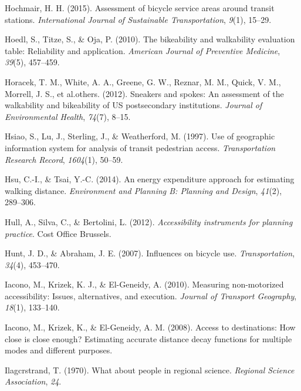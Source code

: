 \documentclass[
11pt, %
oneside, %
english, %
singlespacing, %
]{macthesis} %
\newlength{\cslhangindent}
\newenvironment{CSLReferences}[2] %
 {%
  \setlength{\parindent}{0pt}
  \ifodd #1 \everypar{\setlength{\hangindent}{\cslhangindent}}\ignorespaces\fi
  \ifnum #2 > 0
  \setlength{\parskip}{#2\baselineskip}
  \fi
 }%
 {}
\begin{document}
\begin{CSLReferences}{1}{0}
\leavevmode{}%
Hochmair, H. H. (2015). Assessment of bicycle service areas around transit stations. \emph{International Journal of Sustainable Transportation}, \emph{9}(1), 15--29.

\leavevmode{}%
Hoedl, S., Titze, S., \& Oja, P. (2010). The bikeability and walkability evaluation table: Reliability and application. \emph{American Journal of Preventive Medicine}, \emph{39}(5), 457--459.

\leavevmode{}%
Horacek, T. M., White, A. A., Greene, G. W., Reznar, M. M., Quick, V. M., Morrell, J. S., et al.others. (2012). Sneakers and spokes: An assessment of the walkability and bikeability of US postsecondary institutions. \emph{Journal of Environmental Health}, \emph{74}(7), 8--15.

\leavevmode{}%
Hsiao, S., Lu, J., Sterling, J., \& Weatherford, M. (1997). Use of geographic information system for analysis of transit pedestrian access. \emph{Transportation Research Record}, \emph{1604}(1), 50--59.

\leavevmode{}%
Hsu, C.-I., \& Tsai, Y.-C. (2014). An energy expenditure approach for estimating walking distance. \emph{Environment and Planning B: Planning and Design}, \emph{41}(2), 289--306.

\leavevmode{}%
Hull, A., Silva, C., \& Bertolini, L. (2012). \emph{Accessibility instruments for planning practice}. Cost Office Brussels.

\leavevmode{}%
Hunt, J. D., \& Abraham, J. E. (2007). Influences on bicycle use. \emph{Transportation}, \emph{34}(4), 453--470.

\leavevmode{}%
Iacono, M., Krizek, K. J., \& El-Geneidy, A. (2010). Measuring non-motorized accessibility: Issues, alternatives, and execution. \emph{Journal of Transport Geography}, \emph{18}(1), 133--140.

\leavevmode{}%
Iacono, M., Krizek, K., \& El-Geneidy, A. M. (2008). Access to destinations: How close is close enough? Estimating accurate distance decay functions for multiple modes and different purposes.

\leavevmode{}%
Ilagcrstrand, T. (1970). What about people in regional science. \emph{Regional Science Association}, \emph{24}.


\end{CSLReferences}
\end{document}
